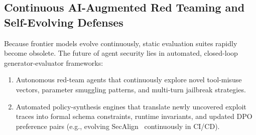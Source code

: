\subsection{Continuous AI-Augmented Red Teaming and Self-Evolving Defenses}
\label{subsec:ai_red_teaming}

Because frontier models evolve continuously, static evaluation suites rapidly become obsolete. The future of agent security lies in automated, closed-loop generator-evaluator frameworks:
\begin{enumerate}
    \item Autonomous red-team agents that continuously explore novel tool-misuse vectors, parameter smuggling patterns, and multi-turn jailbreak strategies.
    \item Automated policy-synthesis engines that translate newly uncovered exploit traces into formal schema constraints, runtime invariants, and updated DPO preference pairs (e.g., evolving SecAlign~\cite{chen2025secalign} continuously in CI/CD).
\end{enumerate}
